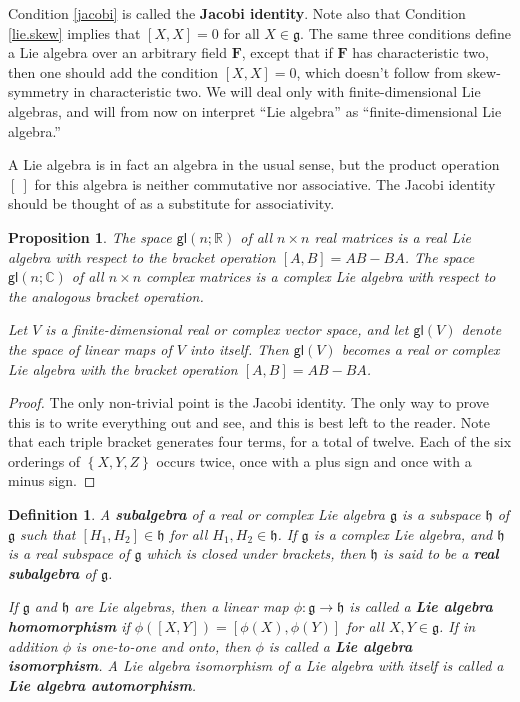 \documentclass{amsbook}
\let \frak = \mathfrak
\theoremstyle{plain}
\newtheorem{definition}[theorem]{Definition}
\newtheorem{proposition}[theorem]{Proposition}
\numberwithin{equation}{chapter}
\numberwithin{theorem}{chapter}
\begin{document}
Condition \ref{jacobi} is called the \textbf{Jacobi identity}. Note also that
Condition \ref{lie.skew} implies that $\left[  X,X\right]  =0$ for all
$X\in\frak{g}$. The same three conditions define a Lie algebra over an
arbitrary field $\mathbf{F}$, except that if $\mathbf{F}$ has characteristic
two, then one should add the condition $\left[  X,X\right]  =0$, which doesn't
follow from skew-symmetry in characteristic two. We will deal only with
finite-dimensional Lie algebras, and will from now on interpret ``Lie
algebra'' as ``finite-dimensional Lie algebra.''

A Lie algebra is in fact an algebra in the usual sense, but the product
operation $\left[  \ \right]  $ for this algebra is neither commutative nor
associative. The Jacobi identity should be thought of as a substitute for associativity.

\begin{proposition}
The space $\mathsf{gl}(n;\mathbb{R})$ of all $n\times n$ real matrices is a
real Lie algebra with respect to the bracket operation $\left[  A,B\right]
=AB-BA$. The space $\mathsf{gl}(n;\mathbb{C})$ of all $n\times n$ complex
matrices is a complex Lie algebra with respect to the analogous bracket operation.

Let $V$ is a finite-dimensional real or complex vector space, and let
$\mathsf{gl}(V)$ denote the space of linear maps of $V$ into itself. Then
$\mathsf{gl}(V)$ becomes a real or complex Lie algebra with the bracket
operation $\left[  A,B\right]  =AB-BA$.
\end{proposition}

\begin{proof}
The only non-trivial point is the Jacobi identity. The only way to prove this
is to write everything out and see, and this is best left to the reader. Note
that each triple bracket generates four terms, for a total of twelve. Each of
the six orderings of $\left\{  X,Y,Z\right\}  $ occurs twice, once with a plus
sign and once with a minus sign.
\end{proof}

\begin{definition}
A \textbf{subalgebra} of a real or complex Lie algebra $\frak{g}$ is a
subspace $\frak{h}$ of $\frak{g}$ such that $\left[  H_{1},H_{2}\right]
\in\frak{h}$ for all $H_{1},H_{2}\in\frak{h}$. If $\frak{g}$ is a complex Lie
algebra, and $\frak{h}$ is a real subspace of $\frak{g}$ which is closed under
brackets, then $\frak{h}$ is said to be a \textbf{real subalgebra} of
$\frak{g}$.

If $\frak{g}$ and $\frak{h}$ are Lie algebras, then a linear map
$\phi:\frak{g}\rightarrow\frak{h}$ is called a \textbf{Lie algebra
homomorphism} if $\phi\left(  \left[  X,Y\right]  \right)  =\left[
\phi(X),\phi(Y)\right]  $ for all $X,Y\in\frak{g}$. If in addition $\phi$ is
one-to-one and onto, then $\phi$ is called a \textbf{Lie algebra isomorphism}.
A Lie algebra isomorphism of a Lie algebra with itself is called a \textbf{Lie
algebra automorphism}.
\end{definition}
\end{document}
